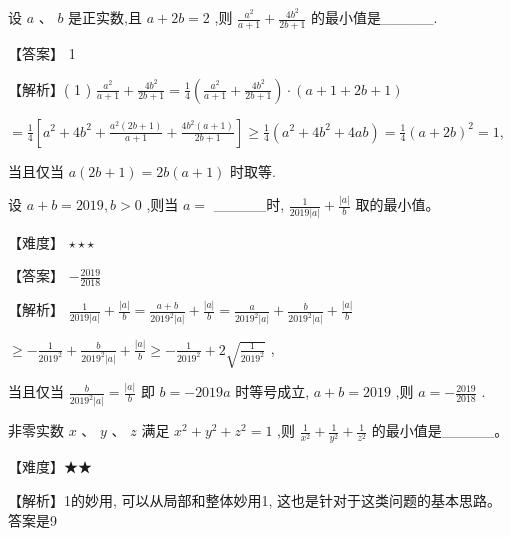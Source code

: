 \documentclass[11pt,a4paper]{article}
\begin{document}
\begin{problem} 
设 \(\displaystyle a\) 、 \(\displaystyle b\) 是正实数,且 \(\displaystyle a + {2b} = 2\) ,则 \(\displaystyle \frac{{a}^{2}}{a + 1} + \frac{4{b}^{2}}{{2b} + 1}\) 的最小值是\_\_\_\_\_.
\begin{jiexi}
【答案】 1

【解析】( 1 ) \(\displaystyle \frac{{a}^{2}}{a + 1} + \frac{4{b}^{2}}{{2b} + 1} = \frac{1}{4}\left( {\frac{{a}^{2}}{a + 1} + \frac{4{b}^{2}}{{2b} + 1}}\right)  \cdot  \left( {a + 1 + {2b} + 1}\right)\)

\(\displaystyle = \frac{1}{4}\left\lbrack  {{a}^{2} + 4{b}^{2} + \frac{{a}^{2}\left( {{2b} + 1}\right) }{a + 1} + \frac{4{b}^{2}\left( {a + 1}\right) }{{2b} + 1}}\right\rbrack   \geq  \frac{1}{4}\left( {{a}^{2} + 4{b}^{2} + {4ab}}\right)  = \frac{1}{4}{\left( a + 2b\right) }^{2} = 1,\)

当且仅当 \(\displaystyle a\left( {{2b} + 1}\right)  = {2b}\left( {a + 1}\right)\) 时取等.


\end{jiexi}
\end{problem}
\begin{problem} 
设 \(\displaystyle a + b = {2019},b > 0\) ,则当 \(\displaystyle a =\) \_\_\_\_\_时, \(\displaystyle \frac{1}{{2019}\left| a\right| } + \frac{\left| a\right| }{b}\) 取的最小值。
\begin{jiexi}[45]
【难度】 \(\displaystyle \star   \star   \star\)

【答案】 \(\displaystyle - \frac{2019}{2018}\)

【解析】 \(\displaystyle \frac{1}{{2019}\left| a\right| } + \frac{\left| a\right| }{b} = \frac{a + b}{{2019}^{2}\left| a\right| } + \frac{\left| a\right| }{b} = \frac{a}{{2019}^{2}\left| a\right| } + \frac{b}{{2019}^{2}\left| a\right| } + \frac{\left| a\right| }{b}\)

\(\displaystyle \geq   - \frac{1}{{2019}^{2}} + \frac{b}{{2019}^{2}\left| a\right| } + \frac{\left| a\right| }{b} \geq   - \frac{1}{{2019}^{2}} + 2\sqrt{\frac{1}{{2019}^{2}}}\) ,

当且仅当 \(\displaystyle \frac{b}{{2019}^{2}\left| a\right| } = \frac{\left| a\right| }{b}\) 即 \(\displaystyle b =  - {2019a}\) 时等号成立, \(\displaystyle a + b = {2019}\) ,则 \(\displaystyle a =  - \frac{2019}{2018}\) .


\end{jiexi}
\end{problem}
\begin{problem} 
非零实数 \(\displaystyle x\) 、 \(\displaystyle y\) 、 \(\displaystyle z\) 满足 \(\displaystyle {x}^{2} + {y}^{2} + {z}^{2} = 1\) ,则 \(\displaystyle \frac{1}{{x}^{2}} + \frac{1}{{y}^{2}} + \frac{1}{{z}^{2}}\) 的最小值是\_\_\_\_\_。
\begin{jiexi}
【难度】★★

【解析】1的妙用, 可以从局部和整体妙用1, 这也是针对于这类问题的基本思路。答案是9


\end{jiexi}
\end{problem}
\end{document}
